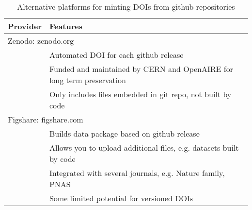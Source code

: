 \documentclass[a4paper,11pt]{article}
\begin{document}
\newpage


\begin{table}[h!]
\centering
\caption{Alternative platforms for minting DOIs from github repositories}
{\footnotesize
\vspace{1cm}
  \begin{tabular}{p{3cm}p{8cm}}
  \hline
  \textbf{Provider} & \textbf{Features} \\ \hline
  \multicolumn{2}{l}{Zenodo: zenodo.org}\\
    & Automated DOI for each github release \\
    & Funded and maintained by CERN and OpenAIRE for long term preservation \\
    & Only includes files embedded in git repo, not built  by code\\
  \multicolumn{2}{l}{Figshare: figshare.com}\\
    & Builds data package based on github release \\
    & Allows you to upload additional files, e.g. datasets built by code \\
    & Integrated with several journals, e.g. Nature family, PNAS \\
    & Some limited potential for versioned DOIs\\
  \hline
  \end{tabular}
  }
\label{tab:doi_minting}
\end{table}

\newpage


\end{document}
